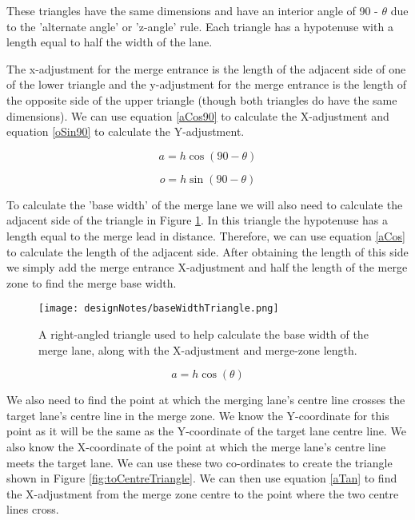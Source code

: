 These triangles have the same dimensions and have an interior angle of 90 - $\theta$ due to the 'alternate angle' or 'z-angle' rule. Each triangle has a hypotenuse with a length equal to half the width of the lane. 

The x-adjustment for the merge entrance is the length of the adjacent side of one of the lower triangle and the y-adjustment for the merge entrance is the length of the opposite side of the upper triangle (though both triangles do have the same dimensions). We can use equation \ref{aCos90} to calculate the X-adjustment and equation \ref{oSin90} to calculate the Y-adjustment.

\begin{equation}\label{aCos90}
a = h \cos(90 - \theta)
\end{equation}{}

\begin{equation}\label{oSin90}
o = h \sin(90 - \theta)
\end{equation}

To calculate the 'base width' of the merge lane we will also need to calculate the adjacent side of the triangle in Figure \ref{fig:baseWidthTriangle}. In this triangle the hypotenuse has a length equal to the merge lead in distance. Therefore, we can use equation \ref{aCos} to calculate the length of the adjacent side. After obtaining the length of this side we simply add the merge entrance X-adjustment and half the length of the merge zone to find the merge base width.

\begin{figure}[htb]
\texttt{[image: designNotes/baseWidthTriangle.png]}
\caption{A right-angled triangle used to help calculate the base width of the merge lane, along with the X-adjustment and merge-zone length.}
\label{fig:baseWidthTriangle}
\end{figure}

\begin{equation}\label{aCos}
a = h \cos(\theta)
\end{equation}

We also need to find the point at which the merging lane's centre line crosses the target lane's centre line in the merge zone. We know the Y-coordinate for this point as it will be the same as the Y-coordinate of the target lane centre line. We also know the X-coordinate of the point at which the merge lane's centre line meets the target lane. We can use these two co-ordinates to create the triangle shown in Figure \ref{fig:toCentreTriangle}. We can then use equation \ref{aTan} to find the X-adjustment from the merge zone centre to the point where the two centre lines cross.

